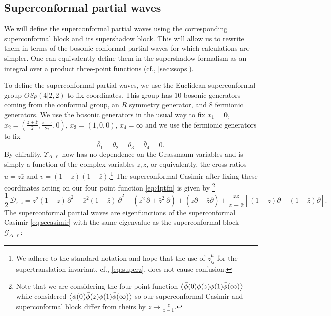 \documentclass[11pt]{article}
\newcommand{\thetab}{\bar{\theta}}
\newcommand{\zb}{\bar{z}}
\newcommand{\phib}{\bar{\phi}}
\begin{document}
\subsection{Superconformal partial waves}
\label{sec:scpw}

We will define the superconformal partial waves using the corresponding superconformal block and its supershadow block. This will allow us to rewrite them in terms of the bosonic conformal partial waves for which calculations are simpler. One can equivalently define them in the supershadow formalism as an integral over a product three-point functions (cf., \cref{sec:ssops}).

To define the superconformal partial waves, we use the Euclidean superconformal group $OSp(4|2,2)$ to fix coordinates. This group has $10$ bosonic generators coming from the conformal group, an $R$ symmetry generator, and $8$ fermionic generators. We use the bosonic generators in the usual way to fix $x_{1} = \mathbf{0}$, $x_{2} = (\frac{z+\zb}{2},\frac{z-\zb}{2i},0)$, $x_{3} = (1,0,0)$, $x_{4} = \infty$ and we use the fermionic generators to fix
%
\begin{equation}\label{eq:grassmanzero}
\thetab_{1} = \theta_{2} = \theta_{3} = \thetab_{4} = 0.
\end{equation}
%
By chirality, $\Upsilon_{\Delta,\ell}$ now has no dependence on the Grassmann variables and is simply a function of the complex variables $z,\zb$, or equivalently, the cross-ratios $u=z\zb$ and $v=(1-z)(1-\zb)$.\footnote{We adhere to the standard notation and hope that the use of $z_{ij}^\mu$ for the supertranslation invariant, cf.,  \eqref{eq:superz}, does not cause confusion. } The superconformal Casimir after fixing these coordinates acting on our four point function \eqref{eq:4ptfn} is given by \cite{Bobev:2015jxa}\footnote{Note that we are considering the four-point function $\expval{ \phib(0)\phi(z)\phi(1)\phib(\infty) }$ while \cite{Bobev:2015jxa} considered $\expval{ \phi(0)\phib(z)\phi(1)\phib(\infty)}$ so our superconformal Casimir and superconformal block differ from theirs by $z \to  \frac{z}{z-1}$.}
%
\begin{equation}\label{eq:sccasimirop}
\frac{1}{2}\, \mathcal{D}_{z,\zb} 
=  z^2(1-z)\,\partial^2 + \zb^2(1-\zb)\,\bar{\partial}^2 - (z^2\,\partial+\zb^2\,\bar{\partial})+ (z\partial+\zb\bar{\partial})+\frac{z\zb}{z-\zb}[(1-z)\partial-(1-\zb)\bar{\partial}].
\end{equation}
% 
The superconformal partial waves are eigenfunctions of the superconformal Casimir \eqref{eq:sccasimir} with the same eigenvalue as the superconformal block $\mathcal{G}_{\Delta,\ell}$:
\end{document}
